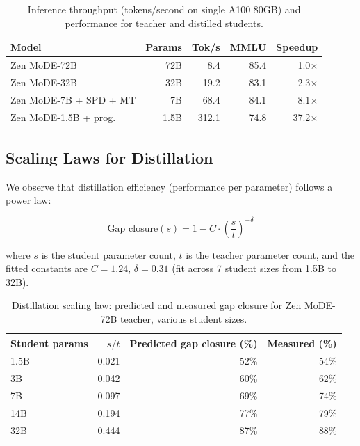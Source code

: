 \documentclass[11pt,a4paper]{article}
\begin{document}
\begin{table}[H]
\centering
\caption{Inference throughput (tokens/second on single A100 80GB) and performance
for teacher and distilled students.}
\begin{tabular}{lrrrr}
\toprule
\textbf{Model} & \textbf{Params} & \textbf{Tok/s} & \textbf{MMLU} & \textbf{Speedup} \\
\midrule
Zen MoDE-72B & 72B & 8.4  & 85.4 & 1.0$\times$ \\
Zen MoDE-32B & 32B & 19.2 & 83.1 & 2.3$\times$ \\
Zen MoDE-7B + SPD + MT & 7B & 68.4 & 84.1 & 8.1$\times$ \\
Zen MoDE-1.5B + prog.  & 1.5B & 312.1 & 74.8 & 37.2$\times$ \\
\bottomrule
\end{tabular}
\label{tab:throughput}
\end{table}

\subsection{Scaling Laws for Distillation}

We observe that distillation efficiency (performance per parameter) follows a power law:

\begin{equation}
    \text{Gap closure}(s) = 1 - C \cdot \left(\frac{s}{t}\right)^{-\delta}
    \label{eq:scaling}
\end{equation}

where $s$ is the student parameter count, $t$ is the teacher parameter count, and the
fitted constants are $C = 1.24$, $\delta = 0.31$ (fit across 7 student sizes from
1.5B to 32B).

\begin{table}[H]
\centering
\caption{Distillation scaling law: predicted and measured gap closure for Zen MoDE-72B
teacher, various student sizes.}
\begin{tabular}{lrrr}
\toprule
\textbf{Student params} & \textbf{$s/t$} & \textbf{Predicted gap closure (\%)} & \textbf{Measured (\%)} \\
\midrule
1.5B & 0.021 & 52\% & 54\% \\
3B   & 0.042 & 60\% & 62\% \\
7B   & 0.097 & 69\% & 74\% \\
14B  & 0.194 & 77\% & 79\% \\
32B  & 0.444 & 87\% & 88\% \\
\bottomrule
\end{tabular}
\label{tab:scaling_law}
\end{table}
\end{document}
